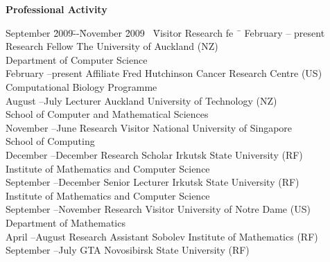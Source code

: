 \documentclass[12pt]{article}
\begin{document}
\centerline{\bf Professional Activity}
\begin{tabbing}
September \=2009\=--\=November \=2009 \ \= Visitor Research fe \ \= \kill
February \>--\> present \> \> Research Fellow \> The University of Auckland (NZ)\\
                \>        \>   \>             \>          \>                          \> Department of Computer Science\\
February \>--\>present\>  \> Affiliate   \> Fred Hutchinson Cancer Research Centre (US)\\
                \>        \>   \>             \>          \>                          \> Computational Biology Programme \\
August \>--\>July \> Lecturer \> Auckland University of Technology (NZ)\\
                \>        \>   \>             \>          \>                          \> School of Computer and Mathematical Sciences\\
November       \>--\>June     \> Research Visitor \> National University of Singapore\\
\> \>\>\>          \>                                  \>School of Computing\\               
December \>--\>December  \> Research Scholar \> Irkutsk State University (RF)\\
                \>        \>   \>             \>          \>                          \>Institute of Mathematics and Computer Science\\
September \>--\>December  \> Senior Lecturer     \> Irkutsk State University (RF)\\
                \>        \>   \>             \>          \>                          \>Institute of Mathematics and Computer Science\\
September \>--\>November  \> Research Visitor   \> University of Notre Dame (US)\\
                \>        \>   \>             \>          \>                          \>Department of Mathematics \\
April           \>--\>August                   \> Research Assistant     \> Sobolev Institute of Mathematics (RF)\\
September \>--\>July                      \> GTA                          \> Novosibirsk State University (RF)\\
\end{tabbing}
\end{document}
